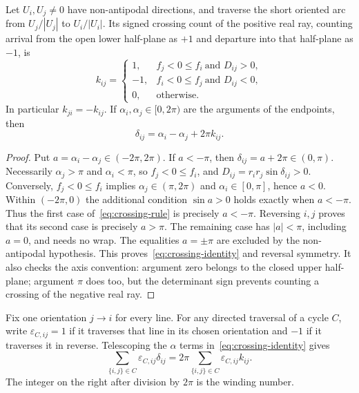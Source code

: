 \begin{lemma}
\label{lem:crossing}
Let $U_i,U_j\ne0$ have non-antipodal directions, and traverse the short
oriented arc from $U_j/|U_j|$ to $U_i/|U_i|$. Its signed crossing count of
the positive real ray, counting arrival from the open lower half-plane as
$+1$ and departure into that half-plane as $-1$, is
\begin{equation}
 k_{ij}=\begin{cases}
 1,& f_j<0\le f_i\ \text{and }D_{ij}>0,\\
 -1,& f_i<0\le f_j\ \text{and }D_{ij}<0,\\
 0,&\text{otherwise}.
 \end{cases}
 \label{eq:crossing-rule}
\end{equation}
In particular $k_{ji}=-k_{ij}$. If $\alpha_i,\alpha_j\in[0,2\pi)$ are the
arguments of the endpoints, then
\begin{equation}
 \delta_{ij}=\alpha_i-\alpha_j+2\pi k_{ij}.
 \label{eq:crossing-identity}
\end{equation}
\end{lemma}
\begin{proof}
Put $a=\alpha_i-\alpha_j\in(-2\pi,2\pi)$.
If $a< -\pi$, then $\delta_{ij}=a+2\pi\in(0,\pi)$.
Necessarily $\alpha_j>\pi$ and $\alpha_i<\pi$, so
$f_j<0\le f_i$, and $D_{ij}=r_ir_j\sin\delta_{ij}>0$.
Conversely, $f_j<0\le f_i$ implies $\alpha_j\in(\pi,2\pi)$ and
$\alpha_i\in[0,\pi]$, hence $a<0$. Within $(-2\pi,0)$ the additional
condition $\sin a>0$ holds exactly when $a< -\pi$.
Thus the first case of~\eqref{eq:crossing-rule} is precisely $a< -\pi$.
Reversing $i,j$ proves that its second case is precisely $a>\pi$.
The remaining case has $|a|<\pi$, including $a=0$, and needs no wrap.
The equalities $a=\pm\pi$ are excluded by the non-antipodal hypothesis.
This proves~\eqref{eq:crossing-identity} and reversal symmetry. It also
checks the axis convention: argument zero belongs to the closed upper
half-plane; argument $\pi$ does too, but the determinant sign prevents
counting a crossing of the negative real ray.
\end{proof}

Fix one orientation $j\to i$ for every line. For any directed traversal of
a cycle $C$, write $\varepsilon_{C,ij}=1$ if it traverses that line in its
chosen orientation and $-1$ if it traverses it in reverse. Telescoping the
$\alpha$ terms in~\eqref{eq:crossing-identity} gives
\begin{equation}
 \sum_{\{i,j\}\in C}\varepsilon_{C,ij}\delta_{ij}
 =2\pi\sum_{\{i,j\}\in C}\varepsilon_{C,ij}k_{ij}.
 \label{eq:cycle-winding}
\end{equation}
The integer on the right after division by $2\pi$ is the winding number.

